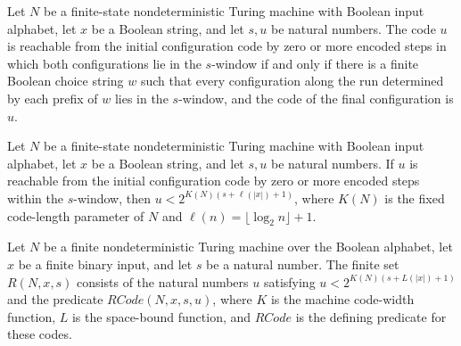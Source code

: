 \begin{theorem}
\label{Complexity.ExpBFS.rcode_iff}
\leanok
{}
Let $N$ be a finite-state nondeterministic Turing machine with Boolean input alphabet,
let $x$ be a Boolean string, and let $s,u$ be natural numbers. The code $u$ is reachable
from the initial configuration code by zero or more encoded steps in which both
configurations lie in the $s$-window if and only if there is a finite Boolean choice
string $w$ such that every configuration along the run determined by each prefix of $w$
lies in the $s$-window, and the code of the final configuration is $u$.
\end{theorem}

\begin{lemma}
\label{Complexity.ExpBFS.rcode_lt}
\leanok
{}
Let $N$ be a finite-state nondeterministic Turing machine with Boolean input alphabet,
let $x$ be a Boolean string, and let $s,u$ be natural numbers. If $u$ is reachable from
the initial configuration code by zero or more encoded steps within the $s$-window, then
$u<2^{K(N)(s+\ell(|x|)+1)}$, where $K(N)$ is the fixed code-length parameter of $N$ and
$\ell(n)=\lfloor\log_2 n\rfloor+1$.
\end{lemma}

\begin{definition}
\label{Complexity.ExpBFS.rset}
\leanok
{}
Let $N$ be a finite nondeterministic Turing machine over the Boolean alphabet, let $x$
be a finite binary input, and let $s$ be a natural number. The finite set $R(N,x,s)$
consists of the natural numbers $u$ satisfying $u<2^{K(N)(s+L(|x|)+1)}$ and the
predicate $RCode(N,x,s,u)$, where $K$ is the machine code-width function, $L$ is the
space-bound function, and $RCode$ is the defining predicate for these codes.
\end{definition}

